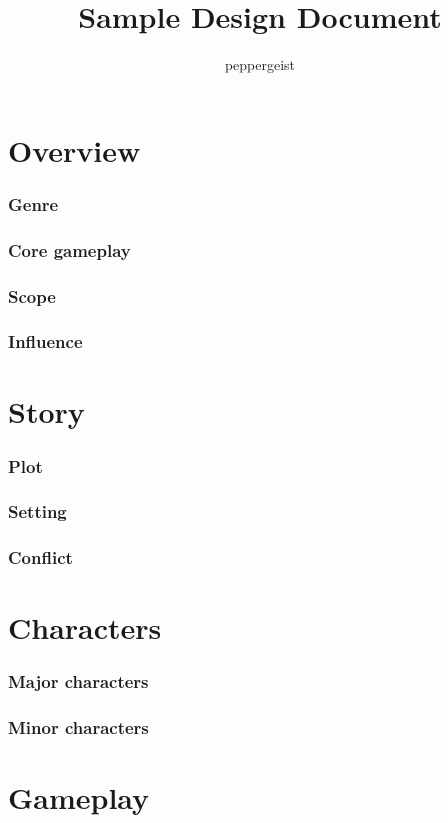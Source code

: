 \documentclass{paper}
\title{Sample Design Document}
\author{peppergeist}
\begin{document}
	\maketitle
	\pagebreak
	\tableofcontents
	\pagebreak
	\part{Overview}
		\lipsum[1]
		\section{Genre}
			\lipsum[1]
		\section{Core gameplay}
			\lipsum[1]
		\section{Scope}
			\lipsum[1]
		\section{Influence}
			\lipsum[1]
	\part{Story}
		\lipsum[2]
		\section{Plot}
			\lipsum[2]
		\section{Setting}
			\lipsum[2]
		\section{Conflict}
			\lipsum[2]
	\part{Characters}
		\lipsum[3]
		\section{Major characters}
			\lipsum[3]
		\section{Minor characters}
			\lipsum[3]
	\part{Gameplay}
		\lipsum[4]
\end{document}
